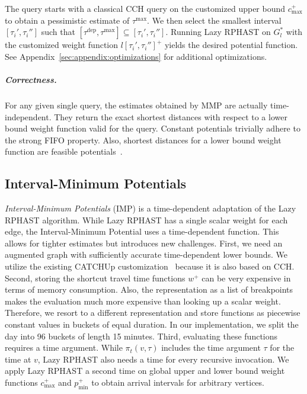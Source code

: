 \documentclass[a4paper,UKenglish,cleveref, autoref, thm-restate,anonymous]{lipics-v2021}
\newcommand*{\pred}{p}
\newcommand*{\comb}{c}
\newcommand*{\tdep}{\tau^{\operatorname{dep}}}
\newcommand*{\tmax}{\tau^{\max}}
\begin{document}
The query starts with a classical CCH query on the customized upper bound $\comb^+_{\max}$ to obtain a pessimistic estimate of $\tmax$.
We then select the smallest interval $[\tau_i', \tau_i'']$ such that $[\tdep,\tmax] \subseteq [\tau_i', \tau_i'']$.
Running Lazy RPHAST on $G^*_l$ with the customized weight function $l[\tau_i', \tau_i'']^+$ yields the desired potential function.
See Appendix~\ref{sec:appendix:optimizations} for additional optimizations.

\subparagraph{Correctness.}
For any given single query, the estimates obtained by MMP are actually time-independent.
They return the exact shortest distances with respect to a lower bound weight function valid for the query.
Constant potentials trivially adhere to the strong FIFO property.
Also, shortest distances for a lower bound weight function are feasible potentials~\cite{strasser_et_al:LIPIcs.SEA.2021.6}.

\subsection{Interval-Minimum Potentials}

\emph{Interval-Minimum Potentials} (IMP) is a time-dependent adaptation of the Lazy RPHAST algorithm.
While Lazy RPHAST has a single scalar weight for each edge, the Interval-Minimum Potential uses a time-dependent function.
This allows for tighter estimates but introduces new challenges.
First, we need an augmented graph with sufficiently accurate time-dependent lower bounds.
We utilize the existing CATCHUp customization~\cite{swz-sfert-21} because it is also based on CCH.
Second, storing the shortcut travel time functions $w^+$ can be very expensive in terms of memory consumption.
Also, the representation as a list of breakpoints makes the evaluation much more expensive than looking up a scalar weight.
Therefore, we resort to a different representation and store functions as piecewise constant values in buckets of equal duration.
In our implementation, we split the day into 96 buckets of length 15 minutes.
Third, evaluating these functions requires a time argument.
While $\pi_t(v, \tau)$ includes the time argument $\tau$ for the time at $v$, Lazy RPHAST also needs a time for every recursive invocation.
We apply Lazy RPHAST a second time on global upper and lower bound weight functions $\comb_{\max}^+$ and $\pred_{\min}^+$ to obtain arrival intervals for arbitrary vertices.
\end{document}
